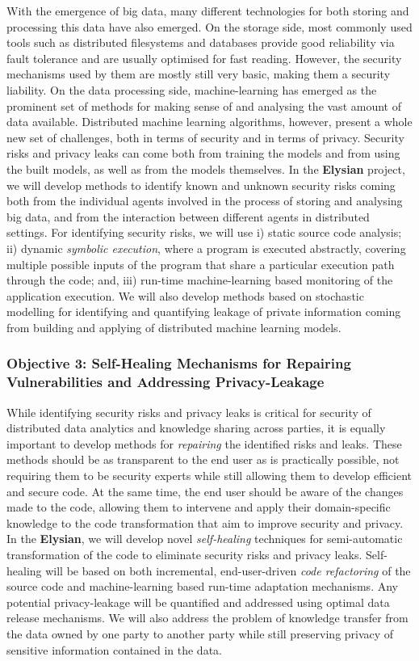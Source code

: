 \documentclass[a4paper,11pt]{article}
\newcommand{\project}[1]{\textbf{#1}\xspace}
\newcommand{\SECURITY}{\project{Elysian}}
\newcommand{\TheProject}{\SECURITY}
\begin{document}
With the emergence of big data, many different technologies for both storing and processing this data have also emerged. On the storage side, most commonly used tools such as distributed filesystems and databases provide good reliability via fault tolerance and are usually optimised for fast reading. However, the security mechanisms used by them are mostly still very basic, making them a security liability. On the data processing side, machine-learning has emerged as the prominent set of methods for making sense of and analysing the vast amount of data available. Distributed machine learning algorithms, however, present a whole new set of challenges, both in terms of security and in terms of privacy. Security risks and privacy leaks can come both from training the models and from using the built models, as well as from the models themselves. In the \TheProject{} project, we will develop methods to identify known and unknown security risks coming both from the individual agents involved in the process of storing and analysing big data, and from the interaction between different agents in distributed settings. For identifying security risks, we will use i) static source code analysis; ii) dynamic \emph{symbolic execution}, where a program is executed abstractly, covering multiple possible inputs of the program that share a particular execution path through the code; and, iii) run-time machine-learning based monitoring of the application execution. We will also develop methods based on stochastic modelling for identifying and quantifying leakage of private information coming from building and applying of distributed machine learning models.

\subsubsection*{Objective 3: Self-Healing Mechanisms for Repairing Vulnerabilities and Addressing Privacy-Leakage}
While identifying security risks and privacy leaks is critical for security of distributed data analytics and knowledge sharing across parties, it is equally important to develop methods for \emph{repairing} the identified risks and leaks. These methods should be as transparent to the end user as is practically possible, not requiring them to be security experts while still allowing them to develop efficient and secure code. At the same time, the end user should be aware of the changes made to the code, allowing them to intervene and apply their domain-specific knowledge to the code transformation that aim to improve security and privacy. In the \TheProject{}, we will develop novel \emph{self-healing} techniques for semi-automatic transformation of the code to eliminate security risks and privacy leaks. Self-healing will be based on both incremental, end-user-driven \emph{code refactoring} of the source code and machine-learning based run-time adaptation mechanisms. Any potential privacy-leakage will be quantified and addressed using optimal data release mechanisms. We will also address the problem of knowledge transfer from the data owned by one party to another party while still preserving privacy of sensitive information contained in the data. 
\end{document}
